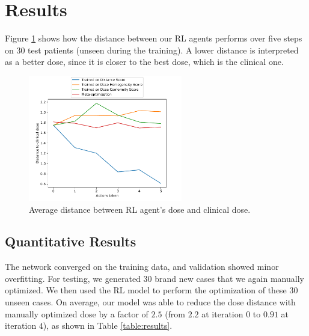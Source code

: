 \section{Results}
Figure \ref{fig:distance} shows how the distance between our RL agents performs over five steps on 30 test patients (unseen during the training).
A lower distance is interpreted as a better dose, since it is closer to the best dose, which is the clinical one.
\begin{figure}
	\centering
	\includegraphics[width=0.6\textwidth]{DistanceToClinicalDose.pdf}
	\caption{Average distance between RL agent's dose and clinical dose.}
	\label{fig:distance}
\end{figure}


\subsection{Quantitative Results}
The network converged on the training data, and validation showed minor overfitting.
For testing, we generated 30 brand new cases that we again manually optimized.
We then used the RL model to perform the optimization of these 30 unseen cases.
On average, our model was able to reduce the dose distance with manually optimized dose by a factor of $2.5$ (from $2.2$ at iteration $0$ to $0.91$ at iteration $4$), as shown in Table \ref{table:results}.

